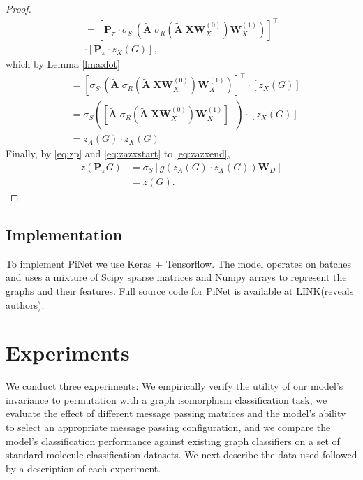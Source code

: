 \documentclass{article}
\renewcommand{\vec}[1]{\mathbf{#1}}
\renewcommand{\P}{\mathbf{P}}
\newcommand{\T}{\top}
\theoremstyle{definition}
\begin{document}
\begin{proof}
\begin{multline}
    = \left[ \P_\pi \cdot \sigma_{S'} \left( \vec{\tilde{A}} \; \sigma_R \left( \vec{\tilde{A} } \; \vec{X} \vec{W}_X^{(0)} \right) \vec{W}_X^{(1)} \right) \right]^\T \\
    \cdot \left[ \P_\pi \cdot z_X(G) \right],
  \end{multline}
  \normalsize
which by Lemma \ref{lma:dot}
  \begin{align}
    &= \left[ \sigma_{S'} \left( \vec{\tilde{A}} \; \sigma_R \left( \vec{\tilde{A} } \; \vec{X} \vec{W}_X^{(0)} \right) \vec{W}_X^{(1)} \right) \right]^\T \cdot \left[ z_X(G) \right] \\
    &= \sigma_{S} \left( \left[ \vec{\tilde{A}} \; \sigma_R \left( \vec{\tilde{A} } \; \vec{X} \vec{W}_X^{(0)} \right) \vec{W}_X^{(1)} \right]^\T \right) \cdot \left[ z_X(G) \right] \\
    \label{eq:zazxend}
    &=  z_A(G) \cdot z_X(G)
  \end{align}
  Finally, by \autoref{eq:zp} and \ref{eq:zazxstart} to \ref{eq:zazxend},
  \begin{align}
    z(\P_\pi G) &= \sigma_S \left[ g\left( z_A \left( G\right) \cdot z_X\left(G\right) \right) \vec{W}_D \right] \\
  &= z(G).
  \end{align}
\end{proof}

\subsection{Implementation}

To implement PiNet we use Keras + Tensorflow. The model operates on batches and uses a mixture of Scipy sparse matrices and Numpy arrays to represent the graphs and their features. Full source code for PiNet is available at LINK(reveals authors).

\section{Experiments}

We conduct three experiments: We empirically verify the utility of our model's invariance to permutation with a graph isomorphism classification task, we evaluate the effect of different message passing matrices and the model's ability to select an appropriate message passing configuration, and we compare the model's classification performance against existing graph classifiers on a set of standard molecule classification datasets. We next describe the data used followed by a description of each experiment.
\end{document}
